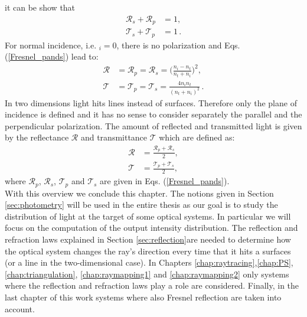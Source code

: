 it can be show that
\begin{equation}
\begin{split}
\mathcal{R}_s+\mathcal{R}_p &= 1,\\
\mathcal{T}_s+\mathcal{T}_p &=1\,.
\end{split}
\end{equation}
For normal incidence, i.e. \myangle$_i = 0$, there is no polarization and Eqs. (\ref{Fresnel_pands}) lead to:
\begin{equation}
\begin{split}
\mathcal{R} &= \mathcal{R}_p = \mathcal{R}_s = \Bigg(\frac{n_i-n_t}{n_t+n_i}\Bigg)^2, \\
\mathcal{T} &= \mathcal{T}_p = \mathcal{T}_s = \frac{4n_i n_t}{(n_t+n_i)^2}\,.
\end{split}
\end{equation}
\indent In two dimensions light hits lines instead of surfaces. Therefore only the plane of incidence is defined and it has no sense to consider separately the parallel and the perpendicular polarization. The amount of reflected and transmitted light is given by the reflectance $\mathcal{R}$ and transmittance $\mathcal{T}$ which are defined as:
\begin{equation}\begin{split}
\mathcal{R} &= \frac{\mathcal{R}_p+ \mathcal{R}_s}{2},\\
\mathcal{T} &= \frac{\mathcal{T}_p+ \mathcal{T}_s}{2}, 
\end{split}
\end{equation}
 where $\mathcal{R}_p$, $\mathcal{R}_s$, $\mathcal{T}_p$ and $\mathcal{T}_s$ are given in Eqs. (\ref{Fresnel_pands}). \\
\indent With this overview we conclude this chapter. The notions given in Section \ref{sec:photometry} will be used in the entire thesis as our goal is to study the distribution of light at the target of some optical systems. In particular we will focus on the computation of the output intensity distribution. The reflection and refraction laws explained in Section \ref{sec:reflection}are needed to determine how the optical system changes the ray's direction every time that it hits a surfaces (or a line in the two-dimensional case). In Chapters \ref{chap:raytracing},\ref{chap:PS}, \ref{chap:triangulation}, \ref{chap:raymapping1} and \ref{chap:raymapping2} only systems where the reflection and refraction laws play a role are considered. Finally, in the last chapter of this work systems where also Fresnel reflection are taken into account.




























